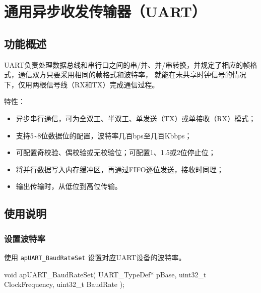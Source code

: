 \documentclass[
  12pt,
]{book}
\newenvironment{Shaded}{\begin{snugshade}}{\end{snugshade}}
\newcommand{\DataTypeTok}[1]{\textcolor[rgb]{0.13,0.29,0.53}{#1}}
\newcommand{\NormalTok}[1]{#1}
\providecommand{\tightlist}{%
  \setlength{\itemsep}{0pt}\setlength{\parskip}{0pt}}
\begin{document}
\hypertarget{ch-uart}{%
\chapter{通用异步收发传输器（UART）}\label{ch-uart}}

\hypertarget{ux529fux80fdux6982ux8ff0-7}{%
\section{功能概述}\label{ux529fux80fdux6982ux8ff0-7}}

UART负责处理数据总线和串行口之间的串/并、并/串转换，并规定了相应的帧格式，通信双方只要采用相同的帧格式和波特率，
就能在未共享时钟信号的情况下，仅用两根信号线（RX和TX）完成通信过程。

特性：

\begin{itemize}
\tightlist
\item
  异步串行通信，可为全双工、半双工、单发送（TX）或单接收（RX）模式；
\item
  支持5\textasciitilde8位数据位的配置，波特率几百bps至几百Kbbps；
\item
  可配置奇校验、偶校验或无校验位；可配置1、1.5或2位停止位；
\item
  将并行数据写入内存缓冲区，再通过FIFO逐位发送，接收时同理；
\item
  输出传输时，从低位到高位传输。
\end{itemize}

\hypertarget{ux4f7fux7528ux8bf4ux660e-8}{%
\section{使用说明}\label{ux4f7fux7528ux8bf4ux660e-8}}

\hypertarget{ux8bbeux7f6eux6ce2ux7279ux7387}{%
\subsection{设置波特率}\label{ux8bbeux7f6eux6ce2ux7279ux7387}}

使用 \texttt{apUART\_BaudRateSet} 设置对应UART设备的波特率。

\begin{Shaded}
\begin{Highlighting}[]
\DataTypeTok{void}\NormalTok{ apUART_BaudRateSet(}
\NormalTok{  UART_TypeDef* pBase, }
  \DataTypeTok{uint32_t}\NormalTok{ ClockFrequency, }
  \DataTypeTok{uint32_t}\NormalTok{ BaudRate}
\NormalTok{  );}
\end{Highlighting}
\end{Shaded}
\end{document}
